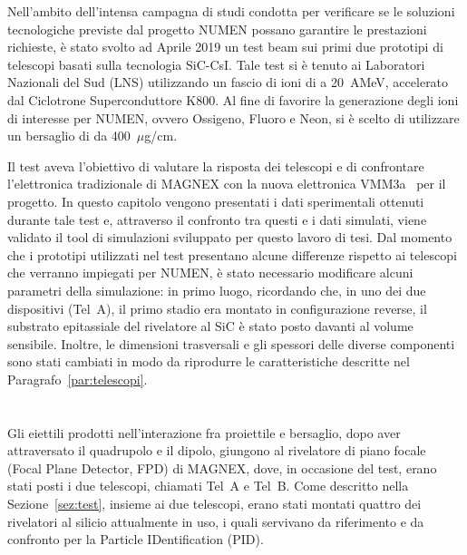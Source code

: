 
Nell'ambito dell'intensa campagna di studi condotta per verificare se le soluzioni tecnologiche previste dal progetto NUMEN possano garantire le prestazioni richieste, è stato svolto ad Aprile 2019 un test beam sui primi due prototipi di telescopi basati sulla tecnologia SiC-CsI.
Tale test si è tenuto ai Laboratori Nazionali del Sud (LNS) utilizzando un fascio di ioni di  a 20~AMeV, accelerato dal Ciclotrone Superconduttore K800.
Al fine di favorire la generazione degli ioni di interesse per NUMEN, ovvero Ossigeno, Fluoro e Neon, si è scelto di utilizzare un bersaglio di  da 400~$\mu$g/cm.

Il test aveva l'obiettivo di valutare la risposta dei telescopi e di confrontare l'elettronica tradizionale di MAGNEX con la nuova elettronica VMM3a~\cite{degeronimo:ieee13} per il progetto.
In questo capitolo vengono presentati i dati sperimentali ottenuti durante tale test e, attraverso il confronto tra questi e i dati simulati, viene validato il tool di simulazioni sviluppato per questo lavoro di tesi.
Dal momento che i prototipi utilizzati nel test presentano alcune differenze rispetto ai telescopi che verranno impiegati per NUMEN, è stato necessario modificare alcuni parametri della simulazione: in primo luogo, ricordando che, in uno dei due dispositivi (Tel~A), il primo stadio era montato in configurazione reverse, il substrato epitassiale del rivelatore al SiC è stato posto davanti al volume sensibile.
Inoltre, le dimensioni trasversali e gli spessori delle diverse componenti sono stati cambiati in modo da riprodurre le caratteristiche descritte nel Paragrafo~\ref{par:telescopi}.


\section{}


Gli eiettili prodotti nell'interazione fra proiettile e bersaglio, dopo aver attraversato il quadrupolo e il dipolo, giungono al rivelatore di piano focale (Focal Plane Detector, FPD) di MAGNEX, dove, in occasione del test, erano stati posti i due telescopi, chiamati Tel~A e Tel~B. 
Come descritto nella Sezione~\ref{sez:test}, insieme ai due telescopi, erano stati montati quattro dei rivelatori al silicio attualmente in uso, i quali servivano da riferimento e da confronto per la Particle IDentification (PID).

